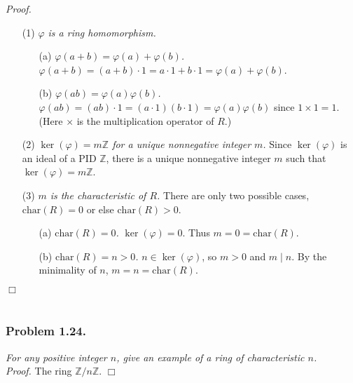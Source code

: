 \documentclass{article}
\begin{document}
\emph{Proof.}
\begin{enumerate}
\item[(1)]
  \emph{$\varphi$ is a ring homomorphism.}
  \begin{enumerate}
  \item[(a)]
    \emph{$\varphi(a+b) = \varphi(a) + \varphi(b)$.}
    $\varphi(a+b)
    = (a+b) \cdot 1
    = a \cdot 1 + b \cdot 1
    = \varphi(a) + \varphi(b)$.
  \item[(b)]
    \emph{$\varphi(ab) = \varphi(a) \varphi(b)$.}
    $\varphi(ab)
    = (ab) \cdot 1
    = (a \cdot 1)(b \cdot 1)
    = \varphi(a) \varphi(b)$
    since $1 \times 1 = 1$. (Here $\times$ is the multiplication operator of $R$.)
  \end{enumerate}
\item[(2)]
  \emph{$\ker(\varphi) = m\mathbb{Z}$ for a unique nonnegative integer $m$.}
  Since $\ker(\varphi)$ is an ideal of a PID $\mathbb{Z}$,
  there is a unique nonnegative integer $m$
  such that $\ker(\varphi) = m\mathbb{Z}$.
\item[(3)]
  \emph{$m$ is the characteristic of $R$.}
  There are only two possible cases,
  $\text{char}(R) = 0$ or else $\text{char}(R) > 0$.
  \begin{enumerate}
  \item[(a)]
    \emph{$\text{char}(R) = 0$.}
    $\ker(\varphi) = 0$. Thus $m = 0 = \text{char}(R)$.
  \item[(b)]
    \emph{$\text{char}(R) = n > 0$.} $n \in \ker(\varphi)$,
    so $m > 0$ and $m \mid n$.
    By the minimality of $n$, $m = n = \text{char}(R)$.
  \end{enumerate}
\end{enumerate}
$\Box$ \\\\






\subsubsection*{Problem 1.24.}
\emph{For any positive integer $n$,
give an example of a ring of characteristic $n$.} \\

\emph{Proof.}
The ring $\mathbb{Z}/n\mathbb{Z}$.
$\Box$ \\\\
\end{document}
